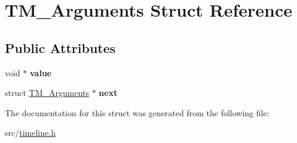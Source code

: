 \hypertarget{structTM__Arguments}{\section{\-T\-M\-\_\-\-Arguments \-Struct \-Reference}
\label{structTM__Arguments}
}
\subsection*{\-Public \-Attributes}
\begin{DoxyCompactItemize}
\item 
\hypertarget{structTM__Arguments_a06f62ef608ece43ba73964a168d8d21f}{void $\ast$ {\bfseries value}}\label{structTM__Arguments_a06f62ef608ece43ba73964a168d8d21f}

\item 
\hypertarget{structTM__Arguments_ac4cfcd43fc4a1df0b4dc7cfdf41e9a16}{struct \hyperlink{structTM__Arguments}{\-T\-M\-\_\-\-Arguments} $\ast$ {\bfseries next}}\label{structTM__Arguments_ac4cfcd43fc4a1df0b4dc7cfdf41e9a16}

\end{DoxyCompactItemize}


\-The documentation for this struct was generated from the following file\-:\begin{DoxyCompactItemize}
\item 
src/\hyperlink{timeline_8h}{timeline.\-h}\end{DoxyCompactItemize}
